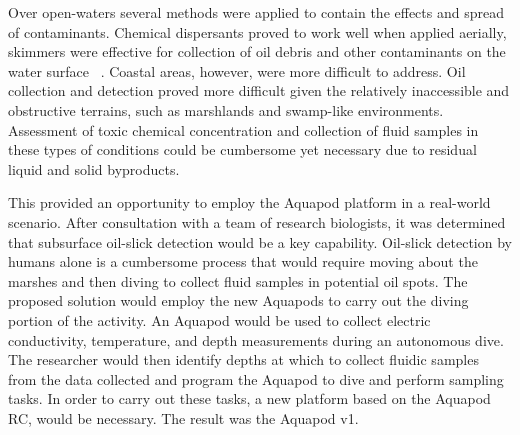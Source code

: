 Over open-waters several methods were applied to contain the effects and spread of contaminants. Chemical dispersants proved to work well when applied aerially, skimmers were effective for collection of oil debris and other contaminants on the water surface ~\cite{skimmers}. Coastal areas, however, were more difficult to address. Oil collection and detection proved more difficult given the relatively inaccessible and obstructive terrains, such as marshlands and swamp-like environments. Assessment of toxic chemical concentration and collection of fluid samples in these types of conditions could be cumbersome yet necessary due to residual liquid and solid byproducts.

This provided an opportunity to employ the Aquapod platform in a real-world scenario. After consultation with a team of research biologists, it was determined that subsurface oil-slick detection would be a key capability. Oil-slick detection by humans alone is a cumbersome process that would require moving about the marshes and then diving to collect fluid samples in potential oil spots. The proposed solution would employ the new Aquapods to carry out the diving portion of the activity. An Aquapod would be used to collect electric conductivity, temperature, and depth measurements during an autonomous dive. The researcher would then identify depths at which to collect fluidic samples from the data collected and program the Aquapod to dive and perform sampling tasks. In order to carry out these tasks, a new platform based on the Aquapod RC, would be necessary. The result was the Aquapod v1. 







